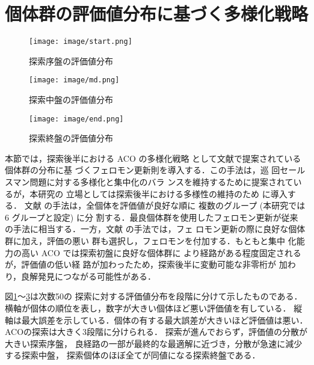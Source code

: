 \documentclass[dvipdfmx,9pt]{ieej}
\begin{document}
\section{個体群の評価値分布に基づく多様化戦略}
\vspace{-1zh}
\begin{figure}[h]
    \centering
     \texttt{[image: image/start.png]}
\caption{探索序盤の評価値分布}
\label{fig:50_125_start.png}
\end{figure}

\vspace{-2zh}\vspace{-1zh}
\begin{figure}[h]
    \centering
    \texttt{[image: image/md.png]}
\caption{探索中盤の評価値分布}
\label{fig:50_125_smd}
\end{figure}

\vspace{-2zh}\vspace{-1zh}
\begin{figure}[h]
    \centering
    \texttt{[image: image/end.png]}
\caption{探索終盤の評価値分布}
\label{fig:50_125_end}
\end{figure}
\vspace{-2zh}

本節では，探索後半における ACO の多様化戦略
として文献\cite{agent}で提案されている個体群の分布に基
づくフェロモン更新則を導入する．この手法は，巡
回セールスマン問題に対する多様化と集中化のバラ
ンスを維持するために提案されているが，本研究の
立場としては探索後半における多様性の維持のため
に導入する．
文献 \cite{agent}の手法は，全個体を評価値が良好な順に
複数のグループ (本研究では 6 グループと設定) に分
割する．最良個体群を使用したフェロモン更新が従来
の手法に相当する．一方，文献\cite{agent} の手法では，フェ
ロモン更新の際に良好な個体群に加え，評価の悪い
群も選択し，フェロモンを付加する．もともと集中
化能力の高い ACO では探索初盤に良好な個体群に
より経路がある程度固定されるが，評価値の低い経
路が加わったため，探索後半に変動可能な非零桁が
加わり，良解発見につながる可能性がある．


図\ref{fig:50_125_start.png}～\ref{fig:50_125_end}は次数50の
探索に対する評価値分布を段階に分けて示したものである．
横軸が個体の順位を表し，数字が大きい個体ほど悪い評価値を有している．
縦軸は最大誤差を示している．個体の有する最大誤差が大きいほど評価値は悪い．
ACOの探索は大きく3段階に分けられる．
探索が進んでおらず，評価値の分散が大きい探索序盤，
良経路の一部が最終的な最適解に近づき，分散が急速に減少する探索中盤，
探索個体のほぼ全てが同値になる探索終盤である．
\end{document}
